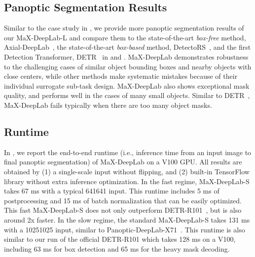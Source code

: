 \subsection{Panoptic Segmentation Results}
Similar to the case study in , we provide more panoptic segmentation results of our MaX-DeepLab-L and compare them to the state-of-the-art {\it box-free} method, Axial-DeepLab~\cite{wang2020axial}, the state-of-the-art {\it box-based} method, DetectoRS~\cite{qiao2020detectors}, and the first Detection Transformer, DETR~\cite{carion2020end} in  and . MaX-DeepLab demonstrates robustness to the challenging cases of similar object bounding boxes and nearby objects with close centers, while other methods make systematic mistakes because of their individual surrogate sub-task design. MaX-DeepLab also shows exceptional mask quality, and performs well in the cases of many small objects. Similar to DETR~\cite{carion2020end}, MaX-DeepLab fails typically when there are too many object masks.

\subsection{Runtime}
In , we report the end-to-end runtime (i.e., inference time from an input image to final panoptic segmentation) of MaX-DeepLab on a V100 GPU. All results are obtained by (1) a single-scale input without flipping, and (2) built-in TensorFlow library without extra inference optimization.
In the fast regime, MaX-DeepLab-S takes 67 ms with a typical 641641 input. This runtime includes 5 ms of postprocessing and 15 ms of batch normalization that can be easily optimized. This fast MaX-DeepLab-S does not only outperform DETR-R101~\cite{carion2020end}, but is also around 2x faster.
In the slow regime, the standard MaX-DeepLab-S takes 131 ms with a 10251025 input, similar to Panoptic-DeepLab-X71~\cite{cheng2019panoptic}. This runtime is also similar to our run of the official DETR-R101 which takes 128 ms on a V100, including 63 ms for box detection and 65 ms for the heavy mask decoding.

